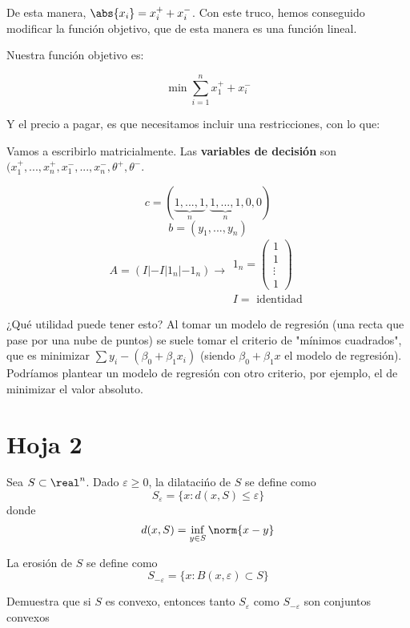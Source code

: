 \begin{problem}[9]
De esta manera, $\abs{x_i} = x_i^+ + x_i^-$. Con este truco, hemos conseguido modificar la función objetivo, que de esta manera es una función lineal.

Nuestra función objetivo es:

\[\min \sum_{i=1}^n x_1^+ + x_i^-\]

Y el precio a pagar, es que necesitamos incluir una restricciones, con lo que:


\begin{ioprob}
\goal{\[\min \sum_{i=1}^n x_1^+ + x_i^-\]}
\end{ioprob}


Vamos a escribirlo matricialmente.
Las \textbf{variables de decisión} son $(x_1^+,...,x_n^+,x_1^-,...,x_n^-,\theta^+,\theta^-$.

\[c = (\underbrace{1,...,1}_{n},\underbrace{1,...,1}_{n},0,0)\]
\[b = (y_1,...,y_n) \]
\[A = \left( I | -I | 1_n | -1_n\right)\to \begin{array}{c}1_n = \begin{pmatrix}1\\1\\\vdots\\1\end{pmatrix}\\ I = \text{ identidad} \end{array}\]




\obs{}
¿Qué utilidad puede tener esto?
Al tomar un modelo de regresión (una recta que pase por una nube de puntos) se suele tomar el criterio de "mínimos cuadrados", que es minimizar $\sum y_i-(β_0+β_1x_i)$ (siendo $β_0+β_1x$ el modelo de regresión).
Podríamos plantear un modelo de regresión con otro criterio, por ejemplo, el de minimizar el valor absoluto.




\end{problem}



\section{Hoja 2}
\begin{problem}[1]
Sea $S\subset \real^n$. Dado $ε\geq 0$, la dilatacińo de $S$ se define como \[S_ε = \{x:d(x,S)\leq ε\}\] donde \[d(x,S) = \inf_{y\in S}{\norm{x-y}}\]

La erosión de $S$ se define como
\[S_{-ε} = \{x:B(x,ε) \subset S \} \]

Demuestra que si $S$ es convexo, entonces tanto $S_{ε}$ como $S_{-ε}$ son conjuntos convexos

\solution
{}

\end{problem}


